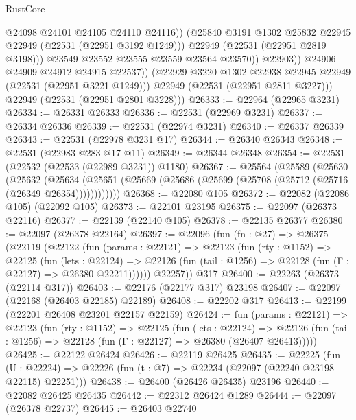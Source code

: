 \begin{lexlean}{RustCore}
\begin{coremodule}
                          @24098
                          @24101
                          @24105
                          @24110
                          @24116))
                      (@25840 @3191 @1302 @25832 @22945 @22949 (@22531 (@22951 @3192 @1249)))
                      @22949
                      (@22531 (@22951 @2819 @3198)))
                    @23549
                    @23552
                    @23555
                    @23559
                    @23564
                    @23570))
                @22903))
            @24906
            @24909
            @24912
            @24915
            @22537))
        (@22929 @3220 @1302 @22938 @22945 @22949 (@22531 (@22951 @3221 @1249)))
        @22949
        (@22531 (@22951 @2811 @3227)))
      @22949
      (@22531 (@22951 @2801 @3228)))
@26333 := @22964 (@22965 @3231)
@26334 := @26331 @26333
@26336 := @22531 (@22969 @3231)
@26337 := @26334 @26336
@26339 := @22531 (@22974 @3231)
@26340 := @26337 @26339
@26343 := @22531 (@22978 @3231 @17)
@26344 := @26340 @26343
@26348 := @22531 (@22983 @283 @17 @11)
@26349 := @26344 @26348
@26354 := @22531 (@22532 (@22533 (@22989 @3231)) @1180)
@26367 := @25564
    (@25589
      (@25630
        (@25632
          (@25634 (@25651 (@25669 (@25686 (@25699 (@25708 (@25712 (@25716 (@26349 @26354))))))))))))
@26368 := @22080 @105
@26372 := @22082 (@22086 @105) (@22092 @105)
@26373 := @22101 @23195
@26375 := @22097 (@26373 @22116)
@26377 := @22139 (@22140 @105)
@26378 := @22135 @26377
@26380 := @22097 (@26378 @22164)
@26397 := @22096
    (fun (fn : @27) =>
    @26375
      (@22119
        (@22122
          (fun (params : @22121) =>
          @22123
            (fun (rty : @1152) =>
            @22125
              (fun (lets : @22124) =>
              @22126 (fun (tail : @1256) => @22128 (fun (Γ : @22127) => @26380 @22211))))))
        @22257))
    @317
@26400 := @22263 (@26373 (@22114 @317))
@26403 := @22176 (@22177 @317) @23198
@26407 := @22097 (@22168 (@26403 @22185) @22189)
@26408 := @22202 @317
@26413 := @22199 (@22201 @26408 @23201 @22157 @22159)
@26424 := fun (params : @22121) =>
  @22123
    (fun (rty : @1152) =>
    @22125
      (fun (lets : @22124) =>
      @22126 (fun (tail : @1256) => @22128 (fun (Γ : @22127) => @26380 (@26407 @26413)))))
@26425 := @22122 @26424
@26426 := @22119 @26425
@26435 := @22225
    (fun (U : @22224) => @22226 (fun (t : @7) => @22234 (@22097 (@22240 @23198 @22115) @22251)))
@26438 := @26400 (@26426 @26435) @23196
@26440 := @22082 @26425 @26435
@26442 := @22312 @26424 @1289
@26444 := @22097 (@26378 @22737)
@26445 := @26403 @22740

\end{coremodule}
\end{lexlean}
